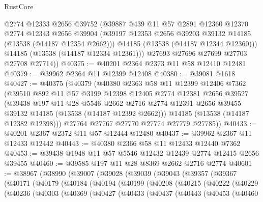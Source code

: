 \begin{lexlean}{RustCore}
\begin{coremodule}
          @2774
          @12333
          @2656
          @39752
          (@39887
            @439
            @11
            @57
            @2891
            @12360
            @12370
            @2774
            @12343
            @2656
            @39904
            (@39197 @12353 @2656 @39203 @39132 @14185 (@13538 (@14187 @12354 @2662)))
            @14185
            (@13538 (@14187 @12344 @12360)))
          @14185
          (@13538 (@14187 @12334 @12361)))
        @27693
        @27696
        @27699
        @27703
        @27708
        @27714))
@40375 := @40201 @2364 @2373 @11 @58 @12410 @12481
@40379 := @39962 @2364 @11 @12399 @12408
@40380 := @39081 @1618
@40427 := @40375
    (@40379
      (@40380
        @2363
        @58
        @11
        @12399
        @12406
        @7362
        (@39510
          @892
          @11
          @57
          @3199
          @12398
          @12405
          @2774
          @12381
          @2656
          @39527
          (@39438
            @197
            @11
            @28
            @5546
            @2662
            @2716
            @2774
            @12391
            @2656
            @39455
            @39132
            @14185
            (@13538 (@14187 @12392 @2662)))
          @14185
          (@13538 (@14187 @12382 @12398)))
        @27764
        @27767
        @27770
        @27774
        @27779
        @27785))
@40433 := @40201 @2367 @2372 @11 @57 @12444 @12480
@40437 := @39962 @2367 @11 @12433 @12442
@40443 := @40380 @2366 @58 @11 @12433 @12440 @7362
@40453 := @39438 @1948 @11 @57 @5546 @12432 @12439 @2774 @12415 @2656 @39455
@40460 := @39585 @197 @11 @28 @8369 @2662 @2716 @2774
@40601 := @38967
    (@38990
      (@39007
        (@39028
          (@39039
            (@39043
              (@39357
                (@39367
                  (@40171
                    (@40179
                      (@40184
                        (@40194
                          (@40199
                            (@40208
                              (@40215
                                (@40222
                                  (@40229
                                    (@40236
                                      (@40303
                                        (@40369
                                          (@40427
                                            (@40433
                                              (@40437
                                                (@40443
                                                  (@40453
                                                    (@40460

\end{coremodule}
\end{lexlean}
